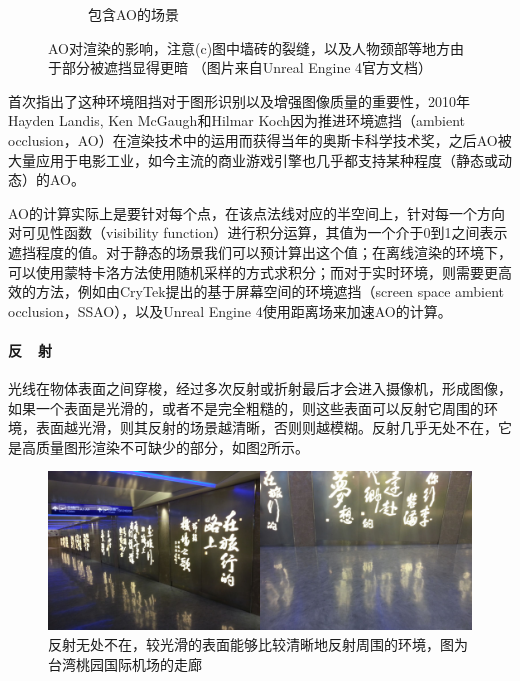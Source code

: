 \begin{figure}
\begin{fullwidth}
\begin{subfigure}[b]{0.325\thewidth}
		\caption{包含AO的场景}
	\end{subfigure}
\caption{AO对渲染的影响，注意(c)图中墙砖的裂缝，以及人物颈部等地方由于部分被遮挡显得更暗 （图片来自Unreal Engine 4官方文档）}
\label{f:intro-ao}
\end{fullwidth}
\end{figure}

\cite{a:Shape-from-shadingonacloudyday}首次指出了这种环境阻挡对于图形识别以及增强图像质量的重要性，2010年Hayden Landis, Ken McGaugh和Hilmar Koch因为推进环境遮挡（ambient occlusion，AO）在渲染技术中的运用而获得当年的奥斯卡科学技术奖，之后AO被大量应用于电影工业，如今主流的商业游戏引擎也几乎都支持某种程度（静态或动态）的AO。

AO的计算实际上是要针对每个点，在该点法线对应的半空间上，针对每一个方向对可见性函数（visibility function）进行积分运算，其值为一个介于0到1之间表示遮挡程度的值。对于静态的场景我们可以预计算出这个值；在离线渲染的环境下，可以使用蒙特卡洛方法使用随机采样的方式求积分\cite{a:GlobalIlluminationandAllThat}；而对于实时环境，则需要更高效的方法，例如由CryTek提出的基于屏幕空间的环境遮挡（screen space ambient occlusion，SSAO），以及Unreal Engine 4使用距离场来加速AO的计算。




\paragraph{反~~射}
光线在物体表面之间穿梭，经过多次反射或折射最后才会进入摄像机，形成图像，如果一个表面是光滑的，或者不是完全粗糙的，则这些表面可以反射它周围的环境，表面越光滑，则其反射的场景越清晰，否则则越模糊。反射几乎无处不在，它是高质量图形渲染不可缺少的部分，如图\ref{f:intro-reflection-1}所示。

\begin{figure}
\includegraphics[width=1.\textwidth]{figures/intro/reflection}	
\caption{反射无处不在，较光滑的表面能够比较清晰地反射周围的环境，图为台湾桃园国际机场的走廊}
\label{f:intro-reflection-1}
\end{figure}

